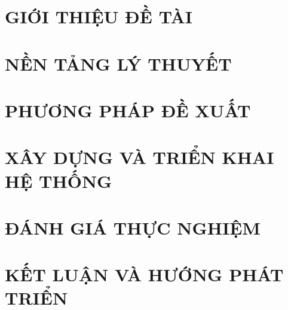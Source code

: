 \documentclass[a4paper,13pt,3p,twoside]{report}
\renewcommand{\bibname}{Danh_sach_tai_lieu_tham_khao}
\theoremstyle{definition}
\begin{document}
\glsaddall 
 \renewcommand*{\glossaryname}{Danh sách thuật ngữ}
\renewcommand*{\acronymname}{DANH MỤC THUẬT NGỮ VÀ TỪ VIẾT TẮT}
\renewcommand*{\entryname}{Thuật ngữ}
\renewcommand*{\descriptionname}{Ý nghĩa}
\printnoidxglossaries


% 


\newpage
{}

\pagestyle{fancy}
\fancyhf{}
\fancyhead[RE, LO]{\leftmark}
\fancyfoot[RE, LO]{\thepage}

\chapter{GIỚI THIỆU ĐỀ TÀI}
\label{chapter:Introduction}

\newpage
\chapter{NỀN TẢNG LÝ THUYẾT}
\label{chapter:Related_works}



\newpage
\chapter{PHƯƠNG PHÁP ĐỀ XUẤT}
\label{chapter:Methodology}


\newpage
\chapter{XÂY DỰNG VÀ TRIỂN KHAI HỆ THỐNG}
\label{chapter:Experiment}


\newpage
\chapter{ĐÁNH GIÁ THỰC NGHIỆM}
\label{chapter:SolutionAndContribution}

\newpage
\chapter{KẾT LUẬN VÀ HƯỚNG PHÁT TRIỂN} %
\label{chapter:conclusion}


\newpage



\newpage
\renewcommand\bibname{TÀI LIỆU THAM KHẢO}
\printbibliography
{}
\end{document}
